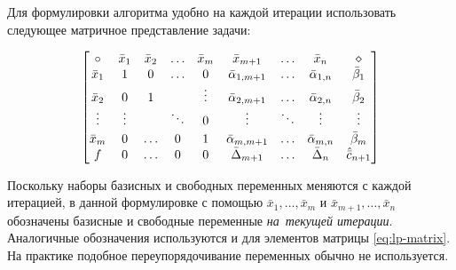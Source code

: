 Для формулировки алгоритма удобно на каждой итерации использовать
следующее матричное представление задачи:

\begin{equation}
  \label{eq:lp-matrix}
  \begin{bmatrix}
    \circ & \bar{x}_1 & \bar{x}_2 & \hdots & \bar{x}_m & \bar{x}_{m+1} & \hdots & \bar{x}_n & \diamond\\
    \bar{x}_1 & 1 & 0 & \hdots & 0  & \bar{\alpha}_{1,{m+1}} & \hdots & \bar{\alpha}_{1,n} & \bar{\beta}_1 \\
    \bar{x}_2 & 0 & 1 & & \vdots & \bar{\alpha}_{2,{m+1}} & \hdots & \bar{\alpha}_{2,n} & \bar{\beta}_2 \\
    \vdots & \vdots & &\vspace{2pt}\ddots  & 0 & \vdots & \ddots & \vdots & \vdots \\
    \bar{x}_m & 0 & \hdots & 0 & 1 & \bar{\alpha}_{m,{m+1}} & \hdots & \bar{\alpha}_{m,n} & \bar{\beta}_m \\
    f & 0 & \hdots & 0 & 0 & \bar{\Delta}_{m+1} & \hdots & \bar{\Delta}_n & \hat{\bar{c}}_{n+1}
  \end{bmatrix}
\end{equation}
\begin{rem}
  Поскольку наборы базисных и свободных переменных меняются с каждой
  итерацией, в данной формулировке с помощью
  $\bar{x}_1,\dotsc,\bar{x}_m$ и $\bar{x}_{m+1}, \dotsc, \bar{x}_n$
  обозначены базисные и свободные переменные \emph{на текущей
    итерации}. Аналогичные обозначения используются и для элементов
  матрицы \eqref{eq:lp-matrix}. На практике подобное
  переупорядочивание переменных обычно не используется.
\end{rem}

